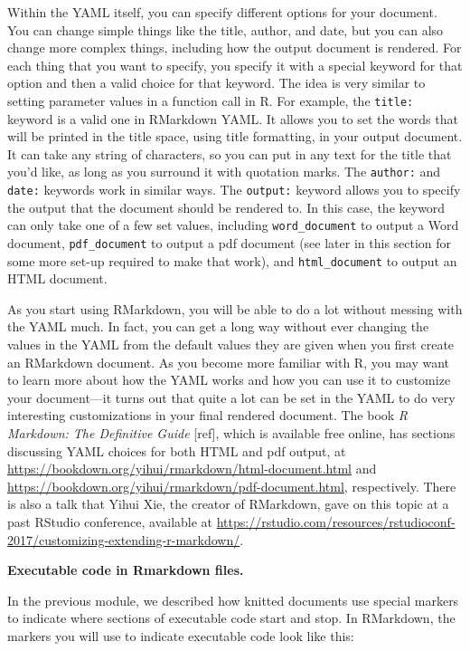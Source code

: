 \documentclass[]{tufte-book}
\begin{document}
Within the YAML itself, you can specify different options for your document.
You can change simple things like the title, author, and date, but you can
also change more complex things, including how the output document is rendered.
For each thing that you want to specify, you specify it with a special
keyword for that option and then a valid choice for that keyword. The idea
is very similar to setting parameter values in a function call in R. For
example, the \texttt{title:} keyword is a valid one in RMarkdown YAML. It allows you
to set the words that will be printed in the title space, using title formatting,
in your output document. It can take any string of characters, so you can put in
any text for the title that you'd like, as long as you surround it with quotation
marks. The \texttt{author:} and \texttt{date:} keywords work in similar ways. The \texttt{output:}
keyword allows you to specify the output that the document should be rendered to.
In this case, the keyword can only take one of a few set values, including
\texttt{word\_document} to output a Word document, \texttt{pdf\_document} to output a pdf
document (see later in this section for some more set-up required to make that
work), and \texttt{html\_document} to output an HTML document.

As you start using RMarkdown, you will be able to do a lot without messing with
the YAML much. In fact, you can get a long way without ever changing the values
in the YAML from the default values they are given when you first create an
RMarkdown document. As you become more familiar with R, you may want to learn
more about how the YAML works and how you can use it to customize your
document---it turns out that quite a lot can be set in the YAML to do very
interesting customizations in your final rendered document. The book \emph{R
Markdown: The Definitive Guide} {[}ref{]}, which is available free online, has
sections discussing YAML choices for both HTML and pdf output, at
\url{https://bookdown.org/yihui/rmarkdown/html-document.html} and
\url{https://bookdown.org/yihui/rmarkdown/pdf-document.html}, respectively. There is
also a talk that Yihui Xie, the creator of RMarkdown, gave on this topic at a
past RStudio conference, available at
\url{https://rstudio.com/resources/rstudioconf-2017/customizing-extending-r-markdown/}.

\textbf{Executable code in Rmarkdown files.}

In the previous module, we described how knitted documents use special markers
to indicate where sections of executable code start and stop. In RMarkdown,
the markers you will use to indicate executable code look like this:
\end{document}
